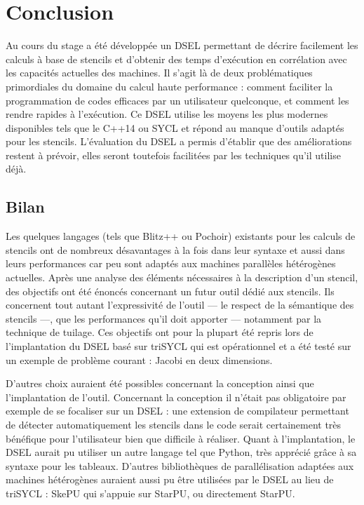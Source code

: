 
\chapter{Conclusion}

Au cours du stage a été développée un DSEL permettant de décrire facilement les calculs à base de stencils et d'obtenir des temps d'exécution en corrélation avec les capacités actuelles des machines. Il s'agit là de deux problématiques primordiales du domaine du calcul haute performance : comment faciliter la programmation de codes efficaces par un utilisateur quelconque, et comment les rendre rapides à l'exécution. Ce DSEL utilise les moyens les plus modernes disponibles tels que le \textsf{C++14} ou \textsf{SYCL} et répond au manque d'outils adaptés pour les stencils. L'évaluation du DSEL a permis d'établir que des améliorations restent à prévoir, elles seront toutefois facilitées par les techniques qu'il utilise déjà. 

\section{Bilan}

Les quelques langages (tels que \textsf{Blitz++} ou \textsf{Pochoir}) existants pour les calculs de stencils ont de nombreux désavantages à la fois dans leur syntaxe et aussi dans leurs performances car peu sont adaptés aux machines parallèles hétérogènes actuelles. Après une analyse des éléments nécessaires à la description d'un stencil, des objectifs ont été énoncés concernant un futur outil dédié aux stencils. Ils concernent tout autant l'expressivité de l'outil --- le respect de la sémantique des stencils ---, que les performances qu'il doit apporter --- notamment par la technique de tuilage. Ces objectifs ont pour la plupart été repris lors de l'implantation du DSEL basé sur \textsf{triSYCL} qui est opérationnel et a été testé sur un exemple de problème courant : Jacobi en deux dimensions. 

D'autres choix auraient été possibles concernant la conception ainsi que l'implantation de l'outil. Concernant la conception il n'était pas obligatoire par exemple de se focaliser sur un DSEL : une extension de compilateur permettant de détecter automatiquement les stencils dans le code serait certainement très bénéfique pour l'utilisateur bien que difficile à réaliser. Quant à l'implantation, le DSEL aurait pu utiliser un autre langage tel que \textsf{Python}, très apprécié grâce à sa syntaxe pour les tableaux. D'autres bibliothèques de parallélisation adaptées aux machines hétérogènes auraient aussi pu être utilisées par le DSEL au lieu de \textsf{triSYCL} : \textsf{SkePU} qui s'appuie sur \textsf{StarPU}, ou directement \textsf{StarPU}.

